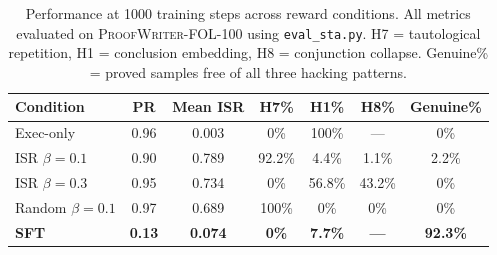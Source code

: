 \begin{table}[t]
\centering
\caption{Performance at 1000 training steps across reward conditions. All metrics evaluated on \textsc{ProofWriter-FOL-100} using \texttt{eval\_sta.py}. H7 = tautological repetition, H1 = conclusion embedding, H8 = conjunction collapse. Genuine\% = proved samples free of all three hacking patterns.}
\label{tab:1000step-comparison}
\small
\setlength{\tabcolsep}{4pt}
\begin{tabular}{@{}lcccccc@{}}
\toprule
\textbf{Condition} & \textbf{PR} & \textbf{Mean ISR} & \textbf{H7\%} & \textbf{H1\%} & \textbf{H8\%} & \textbf{Genuine\%} \\
\midrule
Exec-only           & 0.96 & 0.003 & 0\%    & 100\%  & ---    & 0\%   \\
ISR $\beta{=}0.1$   & 0.90 & 0.789 & 92.2\% & 4.4\%  & 1.1\%  & 2.2\% \\
ISR $\beta{=}0.3$   & 0.95 & 0.734 & 0\%    & 56.8\% & 43.2\% & 0\%   \\
Random $\beta{=}0.1$ & 0.97 & 0.689 & 100\%  & 0\%    & 0\%    & 0\%   \\
\midrule
\rowcolor{gray!15}
\textbf{SFT}        & \textbf{0.13} & \textbf{0.074} & \textbf{0\%} & \textbf{7.7\%} & \textbf{---} & \textbf{92.3\%} \\
\bottomrule
\end{tabular}
\end{table}
